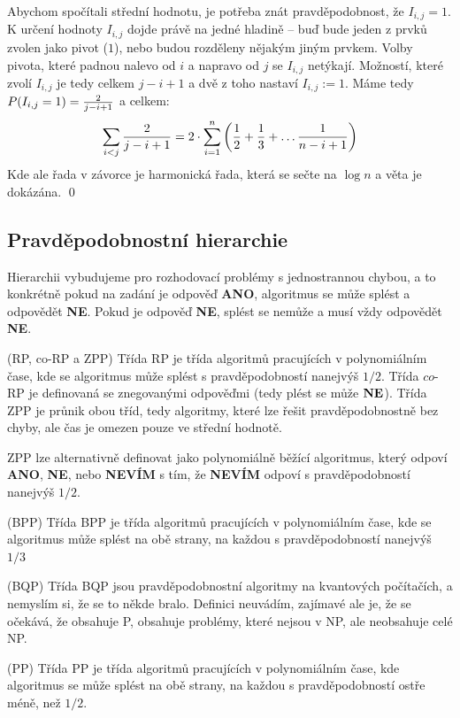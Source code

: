 Abychom spočítali střední hodnotu, je potřeba znát pravděpodobnost, že $I_{i,j}
= 1$. K určení hodnoty $I_{i,j}$ dojde právě na jedné hladině -- buď bude jeden
z prvků zvolen jako pivot ($1$), nebo budou rozděleny nějakým jiným prvkem.
Volby pivota, které padnou nalevo od $i$ a napravo od $j$ se $I_{i,j}$ netýkají.
Možností, které zvolí $I_{i,j}$ je tedy celkem ${j-i+1}$ a dvě z toho nastaví
$I_{i,j} := 1$. Máme tedy $P(I_{i,j} = 1) = {2 \over j-i+1}$ a celkem:
\begin{align}
	\sum_{i < j} {2 \over j-i+1} = 2 \cdot \sum_{i=1}^n \left( {1 \over 2} + {1
		\over 3} +
	\dots {1 \over n-i+1}\right)
\end{align}
Kde ale řada v závorce je harmonická řada, která se sečte na $\log n$ a věta je
dokázána. \qed

\subsection{Pravděpodobnostní hierarchie}

Hierarchii vybudujeme pro rozhodovací problémy s jednostrannou chybou, a to
konkrétně pokud na zadání je odpověď {\bf ANO}, algoritmus se může splést a
odpovědět {\bf NE}. Pokud je odpověď {\bf NE}, splést se nemůže a musí vždy
odpovědět {\bf NE}.

\df (RP, co-RP a ZPP) Třída RP je třída algoritmů pracujících v polynomiálním
čase, kde se algoritmus může splést s pravděpodobností nanejvýš $1/2$. Třída
$co$-RP je definovaná se znegovanými odpověďmi (tedy plést se může ${\bf NE}$).
Třída ZPP je průnik obou tříd, tedy algoritmy, které lze řešit
pravděpodobnostně bez chyby, ale čas je omezen pouze ve střední hodnotě.

\poz ZPP lze alternativně definovat jako polynomiálně běžící algoritmus, který
odpoví {\bf ANO}, {\bf NE}, nebo {\bf NEVÍM} s tím, že {\bf NEVÍM} odpoví s
pravděpodobností nanejvýš $1/2$.

\df (BPP) Třída BPP je třída algoritmů pracujících v polynomiálním čase, kde se
algoritmus může splést na obě strany, na každou s pravděpodobností nanejvýš
$1/3$

\df (BQP) Třída BQP jsou pravděpodobnostní algoritmy na kvantových počítačích, a
nemyslím si, že se to někde bralo. Definici neuvádím, zajímavé ale je, že se
očekává, že obsahuje P, obsahuje problémy, které nejsou v NP, ale neobsahuje
celé NP.

\df (PP) Třída PP je třída algoritmů pracujících v polynomiálním čase, kde
algoritmus se může splést na obě strany, na každou s pravděpodobností ostře
méně, než $1/2$.

